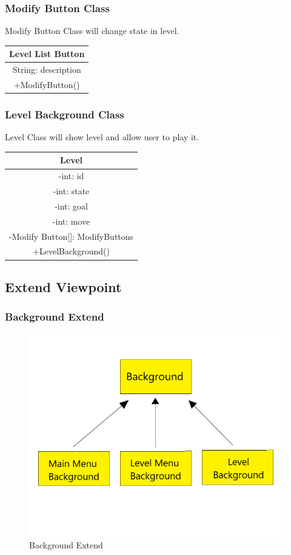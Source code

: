 \subsubsection{Modify Button Class}
Modify Button Class will change state in level.
\begin{center}\begin{tabular}{ |c| } \hline Level List Button \\ \hline String: description\\ \hline +ModifyButton() \\ \hline \end{tabular}\end{center}

\subsubsection{Level Background Class}
Level Class will show level and allow user to play it.
\begin{center}\begin{tabular}{ |c| } \hline Level \\ \hline -int: id \\ -int: state \\ -int: goal \\ -int: move \\ -Modify Button[]: ModifyButtons \\ \hline +LevelBackground() \\ \hline \end{tabular}\end{center}
\subsection{Extend Viewpoint}
\subsubsection{Background Extend}
\begin{figure}[H]
\graphicspath{{pic/}}
\includegraphics[scale=0.5]{bg.png}
\caption{Background Extend}
\vskip 0pt
\end{figure}

